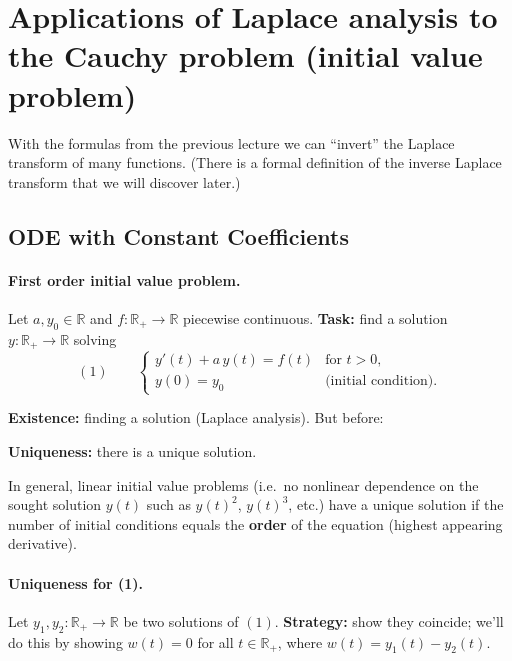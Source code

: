 

\section{Applications of Laplace analysis to the Cauchy problem (initial value problem)}

With the formulas from the previous lecture we can ``invert'' the Laplace transform of many functions. (There is a formal definition of the inverse Laplace transform that we will discover later.)

\subsection{ODE with Constant Coefficients}

\paragraph{First order initial value problem.}
Let $a, y_0 \in \mathbb{R}$ and $f : \mathbb{R}_+ \to \mathbb{R}$ piecewise continuous. \textbf{Task:} find a solution $y : \mathbb{R}_+ \to \mathbb{R}$ solving
\[
(1) \qquad
\begin{cases}
y'(t) + a\,y(t) = f(t) & \text{for } t > 0, \\
y(0) = y_0 & \text{(initial condition).}
\end{cases}
\]

\textbf{Existence:} finding a solution (Laplace analysis). But before:

\textbf{Uniqueness:} there is a unique solution.

\begin{remark}
In general, linear initial value problems (i.e.\ no nonlinear dependence on the sought solution $y(t)$ such as $y(t)^2$, $y(t)^3$, etc.) have a unique solution if the number of initial conditions equals the \textbf{order} of the equation (highest appearing derivative).
\end{remark}

\paragraph{Uniqueness for (1).}
Let $y_1, y_2 : \mathbb{R}_+ \to \mathbb{R}$ be two solutions of $(1)$. \textbf{Strategy:} show they coincide; we'll do this by showing $w(t) = 0$ for all $t \in \mathbb{R}_+$, where $w(t) = y_1(t) - y_2(t)$.

